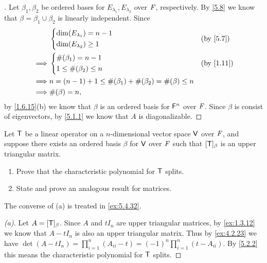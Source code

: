 \begin{proof}[]
	Let \(\beta_1, \beta_2\) be ordered bases for \(E_{\lambda_1}, E_{\lambda_2}\) over \(\mathit{F}\), respectively.
	By \cref{5.8} we know that \(\beta = \beta_1 \cup \beta_2\) is linearly independent.
	Since
	\begin{align*}
		         & \begin{dcases}
			           \dim(E_{\lambda_1}) = n - 1 \\
			           \dim(E_{\lambda_2}) \geq 1
		           \end{dcases}                                    &  & \by{5.7}       \\
		\implies & \begin{dcases}
			           \#(\beta_1) = n - 1 \\
			           1 \leq \#(\beta_2) \leq n
		           \end{dcases}                                         &  & \by{1.11} \\
		\implies & n = (n - 1) + 1 \leq \#(\beta_1) + \#(\beta_2) = \#(\beta) \leq n   \\
		\implies & \#(\beta) = n,
	\end{align*}
	by \cref{1.6.15}(b) we know that \(\beta\) is an ordered basis for \(\mathsf{F}^n\) over \(\mathit{F}\).
	Since \(\beta\) is consist of eigenvectors, by \cref{5.1.1} we know that \(A\) is diagonalizable.
\end{proof}

\begin{ex}\label{ex:5.2.9}
	Let \(\mathsf{T}\) be a linear operator on a \(n\)-dimensional vector space \(\mathsf{V}\) over \(\mathit{F}\), and suppose there exists an ordered basis \(\beta\) for \(\mathsf{V}\) over \(\mathit{F}\) such that \([\mathsf{T}]_{\beta}\) is an upper triangular matrix.
	\begin{enumerate}
		\item Prove that the characteristic polynomial for \(\mathsf{T}\) splits.
		\item State and prove an analogous result for matrices.
	\end{enumerate}
	The converse of (a) is treated in \cref{ex:5.4.32}.
\end{ex}

\begin{proof}[(a)]
	Let \(A = [\mathsf{T}]_{\beta}\).
	Since \(A\) and \(t I_n\) are upper triangular matrices, by \cref{ex:1.3.12} we know that \(A - t I_n\) is also an upper triangular matrix.
	Thus by \cref{ex:4.2.23} we have \(\det(A - t I_n) = \prod_{i = 1}^n (A_{i i} - t) = (-1)^n \prod_{i = 1}^n (t - A_{i i})\).
	By \cref{5.2.2} this means the characteristic polynomial for \(\mathsf{T}\) splits.
\end{proof}

